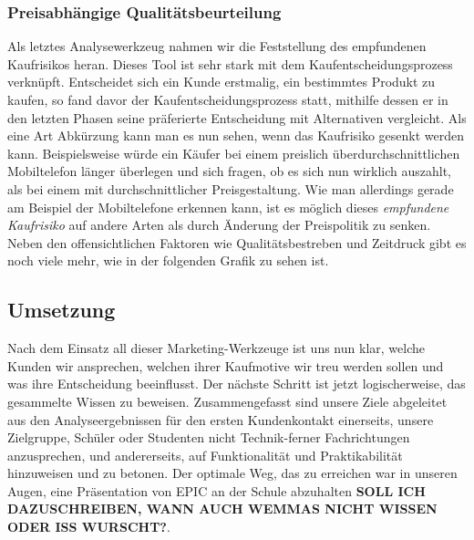 \subsubsection{Preisabhängige Qualitätsbeurteilung}
Als letztes Analysewerkzeug nahmen wir die Feststellung des empfundenen Kaufrisikos heran. Dieses Tool ist sehr stark mit dem Kaufentscheidungsprozess verknüpft. Entscheidet sich ein Kunde erstmalig, ein bestimmtes Produkt zu kaufen, so fand davor der Kaufentscheidungsprozess statt, mithilfe dessen er in den letzten Phasen seine präferierte Entscheidung mit Alternativen vergleicht. Als eine Art Abkürzung kann man es nun sehen, wenn das Kaufrisiko gesenkt werden kann. Beispielsweise würde ein Käufer bei einem preislich überdurchschnittlichen Mobiltelefon länger überlegen und sich fragen, ob es sich nun wirklich auszahlt, als bei einem mit durchschnittlicher Preisgestaltung. Wie man allerdings gerade am Beispiel der Mobiltelefone erkennen kann, ist es möglich dieses \textit{empfundene Kaufrisiko} auf andere Arten als durch Änderung der Preispolitik zu senken. Neben den offensichtlichen Faktoren wie Qualitätsbestreben und Zeitdruck gibt es noch viele mehr, wie in der folgenden Grafik zu sehen ist.\\

\subsection{Umsetzung}
Nach dem Einsatz all dieser Marketing-Werkzeuge ist uns nun klar, welche Kunden wir ansprechen, welchen ihrer Kaufmotive wir treu werden sollen und was ihre Entscheidung beeinflusst. Der nächste Schritt ist jetzt logischerweise, das gesammelte Wissen zu beweisen. Zusammengefasst sind unsere Ziele abgeleitet aus den Analyseergebnissen für den ersten Kundenkontakt einerseits, unsere Zielgruppe, Schüler oder Studenten nicht Technik-ferner Fachrichtungen anzusprechen, und andererseits, auf Funktionalität und Praktikabilität hinzuweisen und zu betonen. Der optimale Weg, das zu erreichen war in unseren Augen, eine Präsentation von EPIC an der Schule abzuhalten \textbf{SOLL ICH DAZUSCHREIBEN, WANN AUCH WEMMAS NICHT WISSEN ODER ISS WURSCHT?}.